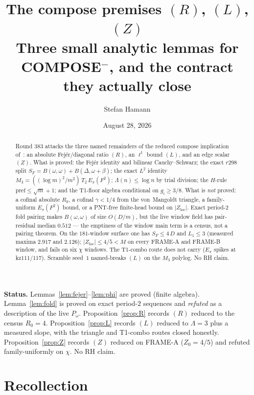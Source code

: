 \documentclass[11pt]{article}
\title{\bfseries The compose premises $(R)$, $(L)$, $(Z)$\\[2mm]
\large Three small analytic lemmas for COMPOSE$^-$,
and the contract they actually close}
\author{Stefan Hamann}
\date{August 28, 2026}
\theoremstyle{remark}
\newcommand{\pref}{\mathrm{pref}}
\newcommand{\loc}{\mathrm{loc}}
\begin{document}
\maketitle

\begin{abstract}\noindent
Round 383 attacks the three named remainders of the reduced
compose implication of~\cite{r378}: an absolute Fej\'er/diagonal
ratio $(R)$, an $\ell^1$ bound $(L)$, and an edge scalar $(Z)$.
What is proved: the Fej\'er identity and bilinear Cauchy--Schwarz;
the exact $r298$ split $S_F=B(\omega,\omega)+B(\Delta,\omega+\beta)$;
the exact $L^2$ identity
$M_3=(({\log m})^2/m^2)\,T_2\,E_\pi(F^2)$;
$\Lambda(n)\le\log n$ by trial division;
the $H$-rule $\pref\le\sqrt{m}+1$;
and the T1-floor algebra conditional on $g_i\ge 3/8$.
What is \emph{not} proved: a cofinal absolute $R_0$, a cofinal
$\gamma<1/4$ from the von~Mangoldt triangle, a family-uniform
$E_\pi(F^2)$ bound, or a PNT-free finite-head bound on
$\lvert Z_{\loc}\rvert$.
Exact period-$2$ fold pairing makes $B(\omega,\omega)$ of size
$O(D/m)$, but the live window field has pair-residual median
$0.512$ --- the emptiness of the window main term is a census,
not a pairing theorem.
On the $181$-window surface one has $S_F\le 4\,D$ and $L_1\le 3$
(measured maxima $2.917$ and $2.126$); $\lvert Z_{\loc}\rvert\le 4/5<M$
on every FRAME-A and FRAME-B window, and fails on six $\chi$ windows.
The T1-combo route does not carry ($E_\pi$ spikes at kz$111$/$117$).
Scramble seed~$1$ named-breaks $(L)$ on the $M_3$ polylog.
No RH claim.
\end{abstract}

\medskip\noindent
\textbf{Status.}\enspace
Lemmas~\ref{lem:fejer}--\ref{lem:phi} are proved (finite algebra).
Lemma~\ref{lem:fold} is proved on exact period-$2$ sequences and
\emph{refuted} as a description of the live $P_\omega$.
Proposition~\ref{prop:R} records $(R)$ reduced to the census $R_0=4$.
Proposition~\ref{prop:L} records $(L)$ reduced to $\Lambda=3$ plus a
measured slope, with the triangle and T1-combo routes closed
honestly.
Proposition~\ref{prop:Z} records $(Z)$ reduced on FRAME-A
($Z_0=4/5$) and refuted family-uniformly on $\chi$.
No RH claim.

\section{Recollection}\label{sec:rec}
\end{document}
